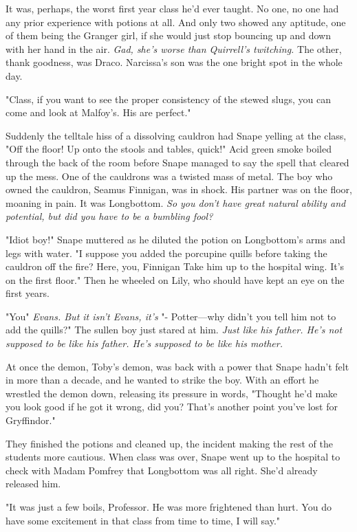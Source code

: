 It was, perhaps, the worst first year class he'd ever taught. No one, no one had any prior experience with potions at all. And only two showed any aptitude, one of them being the Granger girl, if she would just stop bouncing up and down with her hand in the air. \emph{Gad, she's worse than Quirrell's twitching.} The other, thank goodness, was Draco. Narcissa's son was the one bright spot in the whole day.

"Class, if you want to see the proper consistency of the stewed slugs, you can come and look at Malfoy's. His are perfect."

Suddenly the telltale hiss of a dissolving cauldron had Snape yelling at the class, "Off the floor! Up onto the stools and tables, quick!" Acid green smoke boiled through the back of the room before Snape managed to say the spell that cleared up the mess. One of the cauldrons was a twisted mass of metal. The boy who owned the cauldron, Seamus Finnigan, was in shock. His partner was on the floor, moaning in pain. It was Longbottom. \emph{So you don't have great natural ability and potential, but did you have to be a bumbling fool?}

"Idiot boy!" Snape muttered as he diluted the potion on Longbottom's arms and legs with water. "I suppose you added the porcupine quills before taking the cauldron off the fire? Here, you, Finnigan{\el} Take him up to the hospital wing. It's on the first floor." Then he wheeled on Lily, who should have kept an eye on the first years.

"You{\el}" \emph{Evans. But it isn't Evans, it's{\el}} "- Potter—why didn't you tell him not to add the quills?" The sullen boy just stared at him. \emph{Just like his father. He's not supposed to be like his father. He's supposed to be like his mother.}

At once the demon, Toby's demon, was back with a power that Snape hadn't felt in more than a decade, and he wanted to strike the boy. With an effort he wrestled the demon down, releasing its pressure in words, "Thought he'd make you look good if he got it wrong, did you? That's another point you've lost for Gryffindor."

They finished the potions and cleaned up, the incident making the rest of the students more cautious. When class was over, Snape went up to the hospital to check with Madam Pomfrey that Longbottom was all right. She'd already released him.

"It was just a few boils, Professor. He was more frightened than hurt. You do have some excitement in that class from time to time, I will say."

